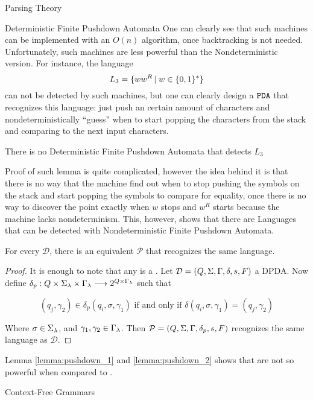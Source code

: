 \begin{section}{Parsing Theory}
\begin{subsection}{Deterministic Finite Pushdown Automata}
One can clearly see that such machines can be implemented with an $O(n)$ algorithm,
once backtracking is not needed. Unfortunately, such machines are less powerful
than the Nondeterministic version. For instance, the language
$$L_3 = \{ww^R\,|\;w \in \{0, 1\}^*\}$$
can not be detected by such machines, but one can clearly design a $\texttt{PDA}$
that recognizes this language: just push an certain amount of characters
and nondeterministically ``guess'' when to start popping the characters
from the stack and comparing to the next input characters.

\begin{lemma}\label{lemma:pushdown_1}
	There is no Deterministic Finite Pushdown Automata that detects $L_3$
\end{lemma}
Proof of such lemma is quite complicated, however the idea behind it is that
there is no way that the machine find out when to stop pushing the symbols
on the stack and start popping the symbols to compare for equality, once
there is no way to discover the point exactly when $w$ stops and $w^R$ starts
because the machine lacks nondeterminism. This, however, shows that there
are Languages that can be detected with Nondeterministic Finite Pushdown
Automata.

\begin{lemma}\label{lemma:pushdown_2}
	For every  $\mathcal{D}$, there is
	an equivalent  $\mathcal{P}$ that recognizes the
	same language.
\end{lemma}
\begin{proof}
	 It is enough to note that any  is a .  Let $\mathcal{D}
	 = (Q, \Sigma, \Gamma, \delta, s, F)$ a DPDA. Now define
	 $\delta_p : Q\times\Sigma_\lambda\times\Gamma_\lambda \longrightarrow 2^{Q\times\Gamma_\lambda}$ such that

	 $$ (q_j, \gamma_2) \in
	 \delta_p(q_i, \sigma, \gamma_1) \text{ if and only if } \delta(q_i,
	 \sigma, \gamma_1) = (q_j, \gamma_2)$$

	 Where $\sigma \in \Sigma_\lambda$, and
	 $\gamma_1, \gamma_2 \in \Gamma_\lambda$. Then $\mathcal{P} = (Q, \Sigma, \Gamma,
	 \delta_p, s, F)$ recognizes the same language as $\mathcal{D}$.
\end{proof}

Lemma \ref{lemma:pushdown_1} and \ref{lemma:pushdown_2} shows that  are not
so powerful when compared to .

\end{subsection}

\begin{subsection}{Context-Free Grammars}\label{cfg}


\end{subsection}
\end{section}
